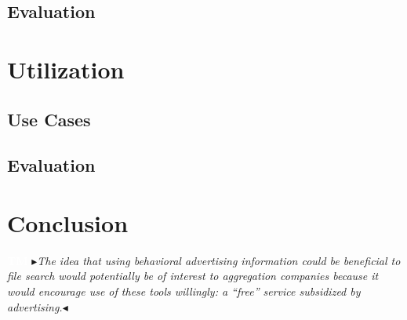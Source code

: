 \documentclass[sigconf,anonymous,review]{acmart}
\newcommand{\nbc}[3]{
 {\colorbox{#3}{\bfseries\sffamily\scriptsize\textcolor{white}{#1}}}
 {\textcolor{#3}{\sf\small$\blacktriangleright$\textit{#2}$\blacktriangleleft$}}}
\newcommand\tm[1]{\nbc{TM}{#1}{tmcolor}}
\begin{document}
\subsection{Evaluation}

\section{Utilization}
\label{sec:utilization}

\subsection{Use Cases}

\subsection{Evaluation}

\section{Conclusion}

\tm{The idea that using behavioral advertising information could be beneficial
to file search would potentially be of interest to aggregation companies
because it would encourage use of these tools willingly: a ``free'' service
subsidized by advertising.}


\nocite{*}
\clearpage



\end{document}
